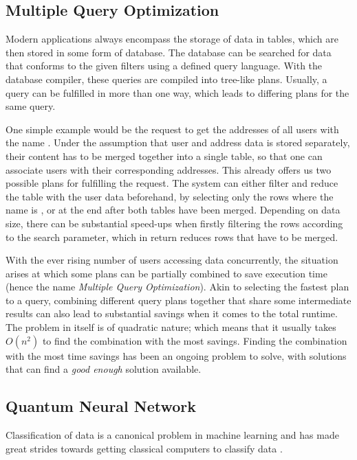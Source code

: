 \subsection{Multiple Query Optimization}
Modern applications always encompass the storage of data in tables, which are then stored in some form of database. The database can be searched for data that conforms to the given filters using a defined query language. With the database compiler, these queries are compiled into tree-like plans. Usually, a query can be fulfilled in more than one way, which leads to differing plans for the same query.\par
One simple example would be the request to get the addresses of all users with the name . Under the assumption that user and address data is stored separately, their content has to be merged together into a single table, so that one can associate users with their corresponding addresses. This already offers us two possible plans for fulfilling the request. The system can either filter and reduce the table with the user data beforehand, by selecting only the rows where the name is , or at the end after both tables have been merged. Depending on data size, there can be substantial speed-ups when firstly filtering the rows according to the search parameter, which in return reduces rows that have to be merged.\par 
With the ever rising number of users accessing data concurrently, the situation arises at which some plans can be partially combined to save execution time (hence the name \emph{Multiple Query Optimization}). Akin to selecting the fastest plan to a query, combining different query plans together that share some intermediate results can also lead to substantial savings when it comes to the total runtime. The problem in itself is of quadratic nature; which means that it usually takes $O(n^2)$ to find the combination with the most savings. Finding the combination with the most time savings has been an ongoing problem to solve, with solutions that can find a \emph{good enough} solution available. 

\subsection{Quantum Neural Network}
Classification of data is a canonical problem in machine learning and has made great strides towards getting classical computers to classify data \cite{Killoran_2019,ClassificationWithQNN}. 

